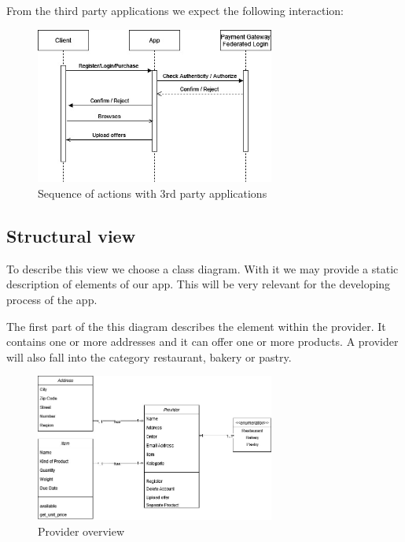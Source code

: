 From the third party applications we expect the following interaction:

\begin{figure}[H]
    \centering
    \includegraphics[width=0.7\textwidth]{assets/sequence_login_payment.jpg}
    \caption{Sequence of actions with 3rd party applications}
    \label{fig:sequence_login_payment}
\end{figure}

\subsection{Structural view}
To describe this view we choose a \gls{class diagram}. With it we may provide a static description of elements
of our app. This will be very relevant for the developing process of the \gls{app}.

The first part of the this diagram describes the element within the \gls{provider}. It contains one or more addresses and it 
can offer one or more products. A provider will also fall into the category restaurant, bakery or pastry.

\begin{figure}[H]
    \centering
    \includegraphics[width=0.7\textwidth]{assets/Provider_Addr_Item.jpg}
    \caption{Provider overview}
    \label{fig:Provider_addr_item}
\end{figure}
 
